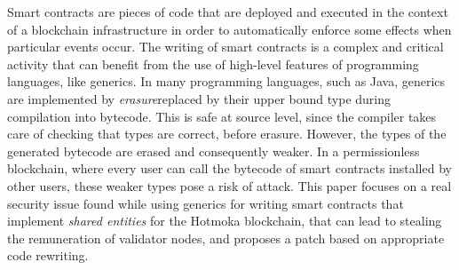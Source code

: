Smart contracts are pieces of code that are deployed and executed in the context of a blockchain infrastructure in order to automatically enforce some effects when particular events occur. The writing of smart contracts is a complex and critical activity that can benefit from the use of high-level features of programming languages, like generics. In many programming languages, such as Java, generics are implemented by \emph{erasure}\ie replaced by their upper bound type during compilation into bytecode. This is safe at source level, since the compiler takes care of checking that types are correct, before erasure. However, the types of the generated bytecode are erased and consequently weaker. In a permissionless blockchain, where every user can call the bytecode of smart contracts installed by other users, these weaker types pose a risk of attack. This paper focuses on a real security issue found while using generics for writing smart contracts that implement \emph{shared entities} for the Hotmoka blockchain, that can lead to stealing the remuneration of validator nodes, and proposes a patch based on appropriate code rewriting.
